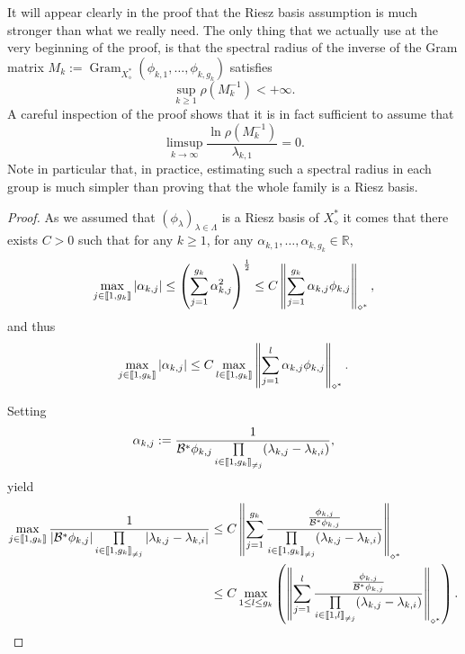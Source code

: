 \documentclass[AHL,Unicode,longabstracts]{cedram}
\newcommand{\llbracket}{\mathopen{[\mkern -2.7mu[}}
\newcommand{\rrbracket}{\mathclose{]\mkern -2.7mu]}}
\newcommand{\inter}[2]{\llbracket #1,#2 \rrbracket}
\newcommand{\interexclu}[3]{\llbracket #1,#2\rrbracket_{\neq #3}}
\newcommand\Bs{\mathcal{B}^*}
\newcommand{\Xalphas}{X_\diamond^*}
\newcommand{\normeXalphas}[1]{\left\| #1 \right\|_{\diamond^*}}
\newcommand{\n}{g}
\newcommand{\R}{\mathbb{R}}
\DeclareMathOperator{\Gram}{Gram}
\begin{document}
\begin{rema}
It will appear clearly in the proof that the Riesz basis assumption is much stronger than what we really need. The only thing that we actually use at the very beginning of the proof, is that the spectral radius of the inverse of the Gram matrix $M_k:={\Gram}_{\Xalphas}(\phi_{k,1},\dotsc,\phi_{k,\n_k})$ satisfies
\[
\sup_{k\geq 1} \rho(M_k^{-1}) < +\infty.
\]
A careful inspection of the proof shows that it is in fact sufficient to assume that
\[
\limsup_{k\to \infty} \frac{\ln \rho(M_k^{-1})}{\lambda_{k,1}} = 0.
\]
Note in particular that, in practice, estimating such a spectral radius in each group is much simpler than proving that the whole family is a Riesz basis.
\end{rema}

\begin{proof}
As we assumed that $(\phi_\lambda)_{\lambda \in \Lambda}$ is a Riesz basis of $\Xalphas$ it comes that there exists $C>0$ such that for any $k \geq 1$, for any $\alpha_{k,1}, \dots, \alpha_{k,\n_k} \in \R$,
\[
\max_{j\in \inter{1}{\n_k}} |\alpha_{k,j}| \leq \left(\sum_{j=1}^{\n_k} \alpha_{k,j}^2 \right)^{\frac{1}{2}}
\leq C \normeXalphas{ \sum_{j=1}^{\n_k} \alpha_{k,j} \phi_{k,j} },
\]
and thus
\[
\max_{j\in \inter{1}{\n_k}} |\alpha_{k,j}| \leq C \max\limits_{l\in \inter{1}{\n_k}} \normeXalphas{ \sum_{j=1}^{l} \alpha_{k,j} \phi_{k,j} }.
\]

\pagebreak
Setting
\[
\alpha_{k,j} := \frac{1}{ \Bs \phi_{k,j} \prod\limits_{i\in \interexclu{1}{\n_k}{j}} (\lambda_{k,j}-\lambda_{k,i})},
\]
yield
\begin{align*}
\max\limits_{j\in \inter{1}{\n_k}} \frac{1}{ | \Bs\phi_{k,j} | \prod\limits_{i\in\interexclu{1}{\n_k}{j}}|\lambda_{k,j}-\lambda_{k,i} | } &\leq C \normeXalphas{\sum\limits_{j=1}^{\n_k} \frac{ \frac{\phi_{k,j}}{\Bs \phi_{k,j}}}{\prod\limits_{i\in \interexclu{1}{\n_k}{j}} (\lambda_{k,j}-\lambda_{k,i})}}
\\
&\leq C \max\limits_{1 \leq l \leq \n_k} \left(\normeXalphas{\sum\limits_{j=1}^{l} \frac{ \frac{\phi_{k,j}}{\Bs \phi_{k,j}}}{\prod\limits_{i\in \interexclu{1}{l}{j}} (\lambda_{k,j}-\lambda_{k,i})}} \right).
\end{align*}




\end{proof}
\end{document}
